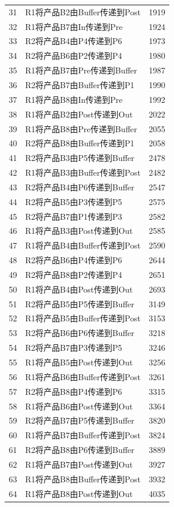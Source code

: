 \documentclass{ctexart}
\begin{document}
{{\begin{longtable}{clc}
        31 & R1将产品B2由Buffer传递到Post & 1919 \\
        32 & R1将产品B7由In传递到Pre & 1924 \\
        33 & R2将产品B4由P4传递到P6 & 1973 \\
        34 & R2将产品B6由P2传递到P4 & 1980 \\
        35 & R1将产品B7由Pre传递到Buffer & 1987 \\
        36 & R2将产品B7由Buffer传递到P1 & 1990 \\
        37 & R1将产品B8由In传递到Pre & 1992 \\
        38 & R1将产品B2由Post传递到Out & 2022 \\
        39 & R1将产品B8由Pre传递到Buffer & 2055 \\
        40 & R2将产品B8由Buffer传递到P1 & 2058 \\
        41 & R2将产品B3由P5传递到Buffer & 2478 \\
        42 & R1将产品B3由Buffer传递到Post & 2482 \\
        43 & R2将产品B4由P6传递到Buffer & 2547 \\
        44 & R2将产品B5由P3传递到P5 & 2575 \\
        45 & R2将产品B7由P1传递到P3 & 2582 \\
        46 & R1将产品B3由Post传递到Out & 2585 \\
        47 & R1将产品B4由Buffer传递到Post & 2590 \\
        48 & R2将产品B6由P4传递到P6 & 2644 \\
        49 & R2将产品B8由P2传递到P4 & 2651 \\
        50 & R1将产品B4由Post传递到Out & 2693 \\
        51 & R2将产品B5由P5传递到Buffer & 3149 \\
        52 & R1将产品B5由Buffer传递到Post & 3153 \\
        53 & R2将产品B6由P6传递到Buffer & 3218 \\
        54 & R2将产品B7由P3传递到P5 & 3246 \\
        55 & R1将产品B5由Post传递到Out & 3256 \\
        56 & R1将产品B6由Buffer传递到Post & 3261 \\
        57 & R2将产品B8由P4传递到P6 & 3315 \\
        58 & R1将产品B6由Post传递到Out & 3364 \\
        59 & R2将产品B7由P5传递到Buffer & 3820 \\
        60 & R1将产品B7由Buffer传递到Post & 3824 \\
        61 & R2将产品B8由P6传递到Buffer & 3889 \\
        62 & R1将产品B7由Post传递到Out & 3927 \\
        63 & R1将产品B8由Buffer传递到Post & 3932 \\
        64 & R1将产品B8由Post传递到Out & 4035 \\
            

\end{longtable}}}
\end{document}
